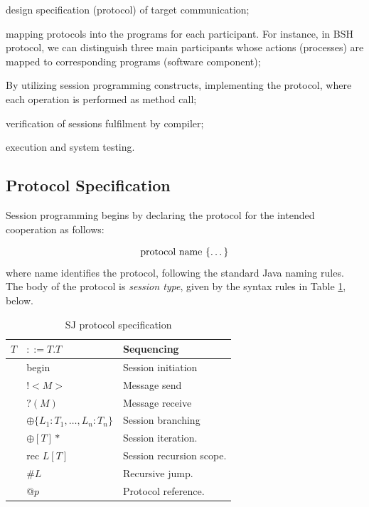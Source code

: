 \documentclass[a4paper]{easychair}
\begin{document}
\begin{compactenum}
  \item design specification (protocol) of target communication;
  \item mapping protocols into the programs for each participant. For instance, in BSH protocol, we can distinguish three main participants whose actions (processes) are mapped to corresponding programs (software component);
  \item By utilizing session programming constructs, implementing the protocol, where each operation is performed as method call;
  \item verification of sessions fulfilment by  compiler;
  \item execution and system testing.
\end{compactenum}

\subsection{Protocol Specification}
Session programming begins by declaring the protocol for the intended cooperation as follows:

\begin{equation*}
\text{protocol name \{\dots\}}
\end{equation*}
where name identifies the protocol, following the standard Java naming rules. The body of the protocol is \textit{session type}, given by the syntax rules in Table \ref{tab:prot-spec}, below.

\begin{longtable}{|p{}|p{}|p{}|}
\caption{SJ protocol specification}\label{tab:prot-spec} \\
\hline
$T$ & $::=T.T$ & Sequencing \\ \hline
& begin & Session initiation \\ \hline
& $!<M>$ & Message send \\ \hline 
& $?(M)$ & Message receive \\ \hline
& $\oplus \{L_1:T_1,\dots, L_n:T_n \}$ & Session branching \\ \hline
& $\oplus [T]*$ & Session iteration. \\ \hline 
& $\text{rec }L[T]$ & Session recursion scope. \\ \hline
& \#$L$ & Recursive jump. \\ \hline
& @$p$ & Protocol reference. \\ \hline
\end{longtable}
\end{document}
